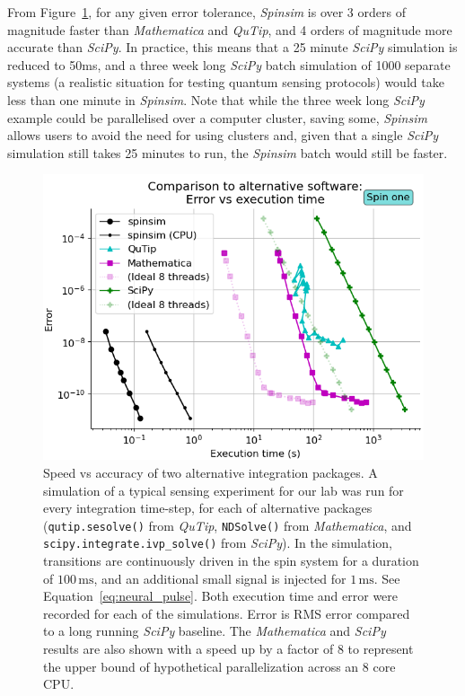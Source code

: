 \documentclass{jors}
\begin{document}
		From Figure~\ref{fig:benchmark_external}, for any given error tolerance, \emph{Spinsim} is over 3 orders of magnitude faster than \emph{Mathematica} and \emph{QuTip}, and 4 orders of magnitude more accurate than \emph{SciPy}.
		In practice, this means that a 25 minute \emph{SciPy} simulation is reduced to 50ms, and a three week long \emph{SciPy} batch simulation of 1000 separate systems (a realistic situation for testing quantum sensing protocols) would take less than one minute in \emph{Spinsim}.
		Note that while the three week long \emph{SciPy} example could be parallelised over a computer cluster, saving some, \emph{Spinsim} allows users to avoid the need for using clusters and, given that a single \emph{SciPy} simulation still takes 25 minutes to run, the \emph{Spinsim} batch would still be faster.
		\begin{figure}[h!]
			\centering
			\includegraphics[scale=0.475]{benchmark_external_execution_error.png} %
			\caption{Speed vs accuracy of two alternative integration packages.
			A simulation of a typical sensing experiment for our lab was run for every integration time-step, for each of alternative packages (\texttt{qutip.sesolve()} from \emph{QuTip}, \texttt{NDSolve()} from \emph{Mathematica}, and \texttt{scipy.integrate.ivp\_solve()} from \emph{SciPy}).
			In the simulation, transitions are continuously driven in the spin system for a duration of $ 100\,\text{ms} $, and an additional small signal is injected for $ 1\,\text{ms} $.
			See Equation~\eqref{eq:neural_pulse}.
			Both execution time and error were recorded for each of the simulations.
			Error is RMS error compared to a long running \emph{SciPy} baseline.
			The \emph{Mathematica} and \emph{SciPy} results are also shown with a speed up by a factor of 8 to represent the upper bound of hypothetical parallelization across an 8 core CPU.}
			\label{fig:benchmark_external}
		\end{figure}
\end{document}

